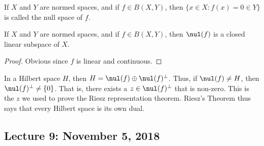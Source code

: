 \documentclass[crop=false,class=book,oneside]{standalone}
\begin{document}
            If $X$ and $Y$ are normed spaces, and if
            $f\in{B(X,Y)}$, then
            $\{x\in{X}:f(x)=0\in{Y}\}$ is called the null
            space of $f$.
            \begin{theorem}
                If $X$ and $Y$ are normed spaces, and if
                $f\in{B(X,Y)}$, then $\nul(f)$ is a closed
                linear subspace of $X$.
            \end{theorem}
            \begin{proof}
                Obvious since $f$ is linear and continuous.
            \end{proof}
            In a Hilbert space $H$, then
            $H=\nul(f)\oplus\nul(f)^{\perp}$. Thus, if
            $\nul(f)\ne{H}$, then $\nul(f)^{\perp}\ne\{0\}$.
            That is, there exists a $z\in\nul(f)^{\perp}$ that
            is non-zero. This is the $z$ we used to prove the
            Riesz representation theorem. Riesz's
            Theorem thus says that every Hilbert space is its own dual.
    \subsection{Lecture 9: November 5, 2018}
\end{document}
